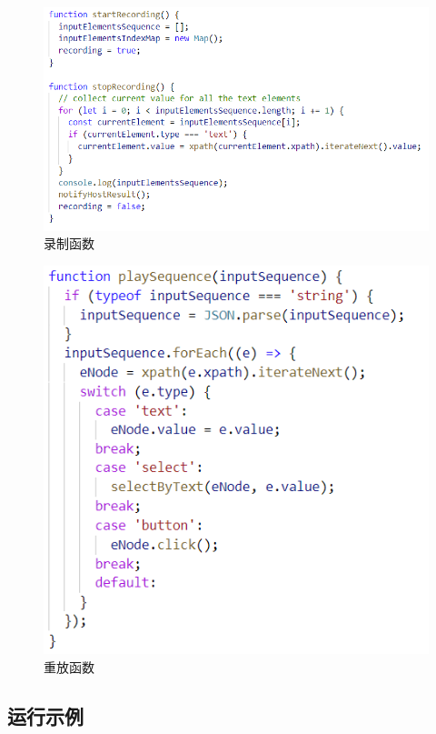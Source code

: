 \documentclass[design, pageheader]{njubachelor}
\begin{document}
\begin{figure}
    \centering
    \includegraphics[width=15cm,keepaspectratio]{figures/record.png}
    \caption{录制函数}
    \label{fig:record}
\end{figure}

\begin{figure}
    \includegraphics{figures/replay.png}
    \caption{重放函数}
    \label{fig:replay}
\end{figure}

\subsection{运行示例}
\end{document}

